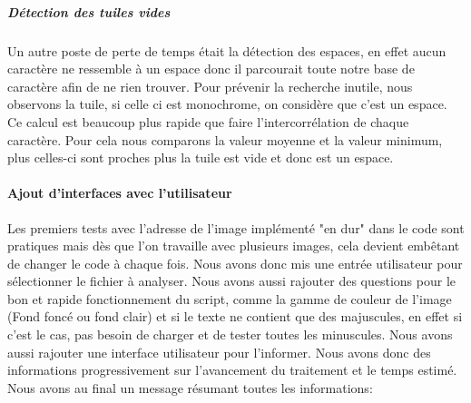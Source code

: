 \documentclass[a4paper,12pt,titlepage]{report}
\begin{document}
\subparagraph{Détection des tuiles vides}
Un autre poste de perte de temps était la détection des espaces, en effet aucun caractère ne ressemble à un espace donc il parcourait toute notre base de caractère afin de ne rien trouver. Pour prévenir la recherche inutile, nous observons la tuile, si celle ci est monochrome, on considère que c'est un espace. Ce calcul est beaucoup plus rapide que faire l'intercorrélation de chaque caractère. Pour cela nous comparons la valeur moyenne et la valeur minimum, plus celles-ci sont proches plus la tuile est vide et donc est un espace.

\paragraph{Ajout d'interfaces avec l'utilisateur}
	Les premiers tests avec l'adresse de l'image implémenté "en dur" dans le code sont pratiques mais dès que l'on travaille avec plusieurs images, cela devient embêtant de changer le code à chaque fois. Nous avons donc mis une entrée utilisateur pour sélectionner le fichier à analyser.
	Nous avons aussi rajouter des questions pour le bon et rapide fonctionnement du script, comme la gamme de couleur de l'image (Fond foncé ou fond clair) et si le texte ne contient que des majuscules, en effet si c'est le cas, pas besoin de charger et de tester toutes les minuscules.
	Nous avons aussi rajouter une interface utilisateur pour l'informer. Nous avons donc des informations progressivement sur l'avancement du traitement et le temps estimé. Nous avons au final un message résumant toutes les informations:\\
\end{document}

